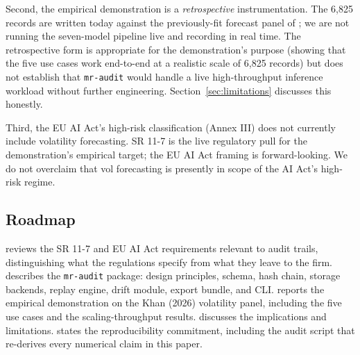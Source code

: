 Second, the empirical demonstration is a \emph{retrospective} instrumentation. The 6,825 records are written today against the previously-fit forecast panel of \citet{KhanVol2026}; we are not running the seven-model pipeline live and recording in real time. The retrospective form is appropriate for the demonstration's purpose (showing that the five use cases work end-to-end at a realistic scale of 6{,}825 records) but does not establish that \texttt{mr-audit} would handle a live high-throughput inference workload without further engineering. Section~\ref{sec:limitations} discusses this honestly.

Third, the EU AI Act's high-risk classification (Annex III) does not currently include volatility forecasting. SR 11-7 is the live regulatory pull for the demonstration's empirical target; the EU AI Act framing is forward-looking. We do not overclaim that vol forecasting is presently in scope of the AI Act's high-risk regime.

\subsection{Roadmap}

 reviews the SR 11-7 and EU AI Act requirements relevant to audit trails, distinguishing what the regulations specify from what they leave to the firm.  describes the \texttt{mr-audit} package: design principles, schema, hash chain, storage backends, replay engine, drift module, export bundle, and CLI.  reports the empirical demonstration on the Khan (2026) volatility panel, including the five use cases and the scaling-throughput results.  discusses the implications and limitations.  states the reproducibility commitment, including the audit script that re-derives every numerical claim in this paper.
